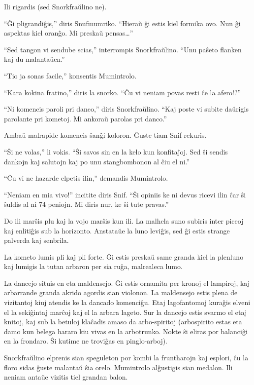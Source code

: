 Ili rigardis (sed Snorkfraŭlino ne).

``Ĝi pligrandiĝis,'' diris Snufmumriko. ``Hieraŭ ĝi estis kiel formika ovo. Nun ĝi aspektas kiel oranĝo. Mi preskaŭ pensas{\ldots}''

``Sed tangon vi sendube scias,'' interrompis Snorkfraŭlino. ``Unu paŝeto flanken kaj du malantaŭen.''

``Tio ja sonas facile,'' konsentis Mumintrolo.

``Kara kokina fratino,'' diris la snorko. ``Ĉu vi neniam povas resti ĉe la afero!?''

``Ni komencis paroli pri danco,'' diris Snorkfraŭlino. ``Kaj poste vi subite daŭrigis parolante pri kometoj. Mi ankoraŭ parolas pri danco.''

Ambaŭ malrapide komencis ŝanĝi koloron. Ĝuste tiam Snif rekuris.

``Ŝi ne volas,'' li vokis. ``Ŝi savos sin en la kelo kun konfitaĵoj. Sed ŝi sendis dankojn kaj salutojn kaj po unu stangbombonon al ĉiu el ni.''

``Ĉu vi ne hazarde elpetis ilin,'' demandis Mumintrolo.

``Neniam en mia vivo!'' incitite diris Snif. ``Ŝi opiniis ke ni devus ricevi ilin ĉar ŝi ŝuldis al ni 74 peniojn. Mi diris nur, ke ŝi tute pravas.''

Do ili marŝis plu kaj la vojo marŝis kun ili. La malhela suno subiris inter piceoj kaj enlitiĝis sub la horizonto. Anstataŭe la luno leviĝis, sed ĝi estis strange palverda kaj senbrila.

La kometo lumis pli kaj pli forte. Ĝi estis preskaŭ same granda kiel la plenluno kaj lumigis la tutan arbaron per sia ruĝa, malrealeca lumo.

La dancejo situis en eta maldensejo. Ĝi estis ornamita per kronoj el lampiroj, kaj arbarrande granda akrido agordis sian violonon. La maldensejo estis plena de vizitantoj kiuj atendis ke la dancado komenciĝu. Etaj lagofantomoj kuraĝis elveni el la sekiĝintaj marĉoj kaj el la arbara lageto. Sur la dancejo estis svarmo el etaj knitoj, kaj sub la betuloj klaĉadis amaso da arbo-spiritoj (arbospirito estas eta damo kun belega hararo kiu vivas en la arbotrunko. Nokte ŝi eliras por balanciĝi en la frondaro. Ŝi kutime ne troviĝas en pinglo-arboj).

Snorkfraŭlino elprenis sian speguleton por kombi la fruntharojn kaj esplori, ĉu la floro sidas ĝuste malantaŭ ŝia orelo. Mumintrolo alĝustigis sian medalon. Ili neniam antaŭe vizitis tiel grandan balon.

